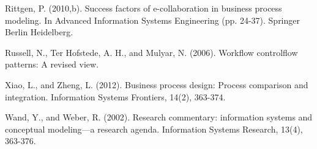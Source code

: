 \documentclass{article}
\begin{document}
Rittgen, P. (2010,b). Success factors of e-collaboration in business process modeling. In Advanced Information Systems Engineering (pp. 24-37). Springer Berlin Heidelberg.


Russell, N., Ter Hofstede, A. H., and Mulyar, N. (2006). Workflow controlflow patterns: A revised view.


Xiao, L., and  Zheng, L. (2012). Business process design: Process comparison and integration. Information Systems Frontiers, 14(2), 363-374.


Wand, Y., and Weber, R. (2002). Research commentary: information systems and conceptual modeling—a research agenda. Information Systems Research, 13(4), 363-376.
\end{document}
